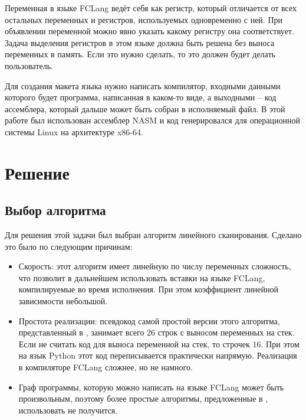 \documentclass[a4paper,14pt]{extarticle}
\begin{document}
Переменная в языке FCLang ведёт себя как регистр, который отличается от всех остальных переменных и регистров, используемых одновременно с ней.
При объявлении переменной можно явно указать какому регистру она соответствует.
Задача выделения регистров в этом языке должна быть решена без выноса переменных в память.
Если это нужно сделать, то это должен будет делать пользователь.

Для создания макета языка нужно написать компилятор, входными данными которого будет программа, написанная в каком-то виде,
а выходными -- код ассемблера, который дальше может быть собран в исполняемый файл.
В этой работе был использован ассемблер NASM и код генерировался для операционной системы Linux на архитектуре x86-64.

\section{Решение}
\subsection{Выбор алгоритма}

Для решения этой задачи был выбран алгоритм линейного сканирования.
Сделано это было по следующим причинам:
\begin{itemize}
    \item Скорость: этот алгоритм имеет линейную по числу переменных сложность, что позволит в дальнейшем использовать вставки на языке FCLang, компилируемые во время исполнения.
        При этом коэффициент линейной зависимости небольшой.
    \item Простота реализации: псевдокод самой простой версии этого алгоритма, представленный в \cite{poletto_linear_1999}, занимает всего 26 строк с выносом переменных на стек.
        Если не считать код для выноса переменной на стек, то строчек 16.
        При этом на язык Python этот код переписывается практически напрямую.
        Реализация в компиляторе FCLang сложнее, но не намного.
    \item Граф программы, которую можно написать на языке FCLang может быть произвольным, 
        поэтому более простые алгоритмы, предложенные в \cite{hutchison_register_2005}, использовать не получится.
\end{itemize}
\end{document}
